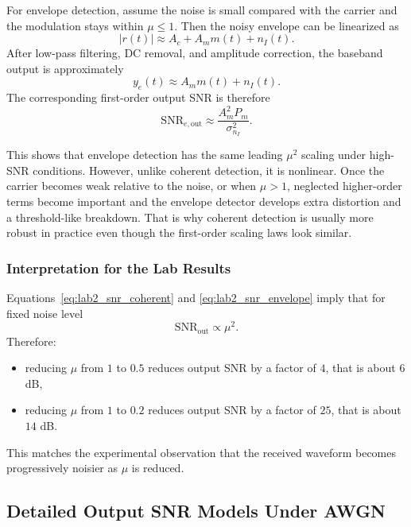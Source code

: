 For envelope detection, assume the noise is small compared with the carrier and
the modulation stays within $\mu \le 1$. Then the noisy envelope can be
linearized as
\begin{equation}
\lvert r(t)\rvert
\approx
A_c+A_m m(t)+n_I(t).
\end{equation}
After low-pass filtering, DC removal, and amplitude correction, the baseband
output is approximately
\begin{equation}
y_e(t)\approx A_m m(t)+n_I(t).
\end{equation}
The corresponding first-order output SNR is therefore
\begin{equation}
\mathrm{SNR}_{e,\mathrm{out}}
\approx
\frac{A_m^2 P_m}{\sigma_{n_I}^2}.
\label{eq:lab2_snr_envelope}
\end{equation}

This shows that envelope detection has the same leading $\mu^2$ scaling under
high-SNR conditions. However, unlike coherent detection, it is nonlinear. Once
the carrier becomes weak relative to the noise, or when $\mu > 1$, neglected
higher-order terms become important and the envelope detector develops extra
distortion and a threshold-like breakdown. That is why coherent detection is
usually more robust in practice even though the first-order scaling laws look
similar.

\subsubsection{Interpretation for the Lab Results}

Equations~\eqref{eq:lab2_snr_coherent} and \eqref{eq:lab2_snr_envelope} imply
that for fixed noise level
\begin{equation}
\mathrm{SNR}_{\mathrm{out}} \propto \mu^2.
\end{equation}
Therefore:
\begin{itemize}
\item reducing $\mu$ from $1$ to $0.5$ reduces output SNR by a factor of $4$,
that is about $6$ dB,
\item reducing $\mu$ from $1$ to $0.2$ reduces output SNR by a factor of $25$,
that is about $14$ dB.
\end{itemize}
This matches the experimental observation that the received waveform becomes
progressively noisier as $\mu$ is reduced.

\subsection{Detailed Output SNR Models Under AWGN}
\label{sec:lab2_awgn_snr_models}

